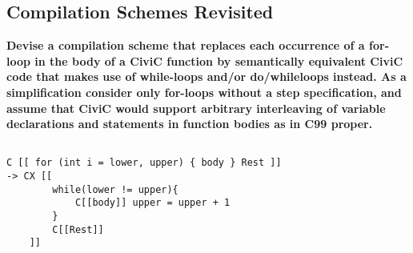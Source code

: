 \documentclass[hidelinks]{uva-inf-article}
\begin{document}
\begin{flushleft}
\newpage
\section{Compilation Schemes Revisited}
\textbf{Devise a compilation scheme that replaces each occurrence of a for-loop in the body of a CiviC
function by semantically equivalent CiviC code that makes use of while-loops and/or do/whileloops instead. As a simplification consider only for-loops without a step specification, and assume
that CiviC would support arbitrary interleaving of variable declarations and statements in function
bodies as in C99 proper.}

\begin{lstlisting}[caption=Compilation Scheme, captionpos=b]

C [[ for (int i = lower, upper) { body } Rest ]]
-> CX [[
        while(lower != upper){ 
            C[[body]] upper = upper + 1 
        } 
        C[[Rest]] 
    ]]
\end{lstlisting}
\end{flushleft}
\end{document}

